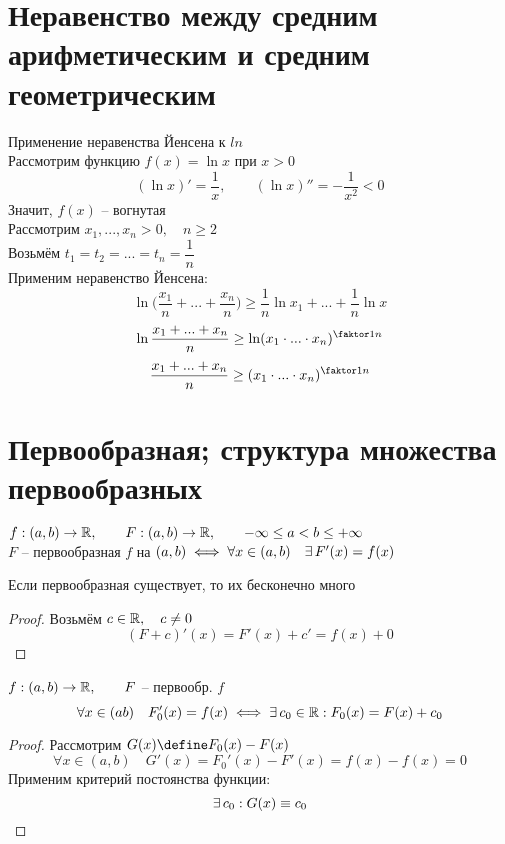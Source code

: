 \section{Неравенство между средним арифметическим и средним геометрическим}

\begin{undefthm}{Применение неравенства Йенсена к $ ln $}
    \hfill \\
	Рассмотрим функцию $ f(x) = \ln x $ при $ x > 0 $
    $$ (\ln x)' = \frac1x, \qquad (\ln x)'' = -\frac1{x^2} < 0 $$
    Значит, $ f(x) $ -- вогнутая \\
    Рассмотрим $ x_1, ..., x_n > 0, \quad n \ge 2 $ \\
    Возьмём $ t_1 = t_2 = ... = t_n = \dfrac1n $ \\
    Применим неравенство Йенсена:
    $$ \ln \bigg( \frac{x_1}n + ... + \frac{x_n}n \bigg) \ge \frac1n \ln x_1 + ... + \frac1n \ln x $$
    $$ \ln \frac{x_1 + ... + x_n}n \ge \ln(x_1 \cdot ... \cdot x_n)^{\faktor1n} $$
    $$ \frac{x_1 + ... + x_n}n \ge (x_1 \cdot ... \cdot x_n)^{\faktor1n} $$
\end{undefthm}

\section{Первообразная; структура множества первообразных}

\begin{definition}
	$ f : (a, b) \to \mathbb{R}, \qquad F : (a, b) \to \mathbb{R}, \qquad -\infty \le a < b \le +\infty $ \\
    $ F $ -- первообразная $ f $ на $ (a, b) \iff \forall x \in (a, b) \quad \exists\, F'(x) = f(x) $
\end{definition}

\begin{statement}
	Если первообразная существует, то их бесконечно много
\end{statement}

\begin{proof}
	Возьмём $ c \in \mathbb{R}, \quad c \ne 0 $
    $$ (F + c)'(x) = F'(x) + c' = f(x) + 0 $$
\end{proof}

\begin{theorem}
	$ f : (a, b) \to \mathbb{R}, \qquad F $ -- первообр. $ f $
    $$ \forall x \in (a b) \quad F_0'(x) = f(x) \iff \exists\, c_0 \in \mathbb{R} : F_0(x) = F(x) + c_0 $$
\end{theorem}

\begin{proof}
	Рассмотрим $ G(x) \define F_0(x) - F(x) $
    $$ \forall x \in (a, b) \quad G'(x) = F_0'(x) - F'(x) = f(x) - f(x) = 0 $$
    Применим критерий постоянства функции:
    $$ \exists\, c_0 : G(x) \equiv c_0 $$
\end{proof}

